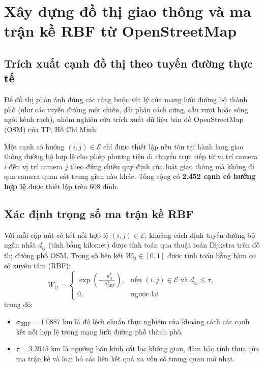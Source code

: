\section{Xây dựng đồ thị giao thông và ma trận kề RBF từ OpenStreetMap}
\label{sec:xay_dung_do_thi_osm}

\subsection{Trích xuất cạnh đồ thị theo tuyến đường thực tế}
Để đồ thị phản ánh đúng các ràng buộc vật lý của mạng lưới đường bộ thành phố (như các tuyến đường một chiều, dải phân cách cứng, cầu vượt hoặc sông ngòi kênh rạch), nhóm nghiên cứu trích xuất dữ liệu bản đồ OpenStreetMap (OSM) của TP. Hồ Chí Minh.

Một cạnh có hướng $(i, j) \in \mathcal{E}$ chỉ được thiết lập nếu tồn tại hành lang giao thông đường bộ hợp lệ cho phép phương tiện di chuyển trực tiếp từ vị trí camera $i$ đến vị trí camera $j$ theo đúng chiều quy định của luật giao thông mà không đi qua camera quan sát trung gian nào khác. Tổng cộng có \textbf{2.452 cạnh có hướng hợp lệ} được thiết lập trên 608 đỉnh.

\subsection{Xác định trọng số ma trận kề RBF}
Với mỗi cặp nút có kết nối hợp lệ $(i, j) \in \mathcal{E}$, khoảng cách định tuyến đường bộ ngắn nhất $d_{ij}$ (tính bằng kilomet) được tính toán qua thuật toán Dijkstra trên đồ thị đường phố OSM. Trọng số liên kết $W_{ij} \in [0, 1]$ được tính toán bằng hàm cơ sở xuyên tâm (RBF):
\begin{equation}
W_{ij} =
\begin{cases}
\exp\left(-\frac{d_{ij}^2}{\sigma_{\mathrm{RBF}}^2}\right), & \text{nếu } (i,j) \in \mathcal{E} \text{ và } d_{ij} \le \tau, \\
0, & \text{ngược lại}
\end{cases}
\end{equation}
trong đó:
\begin{itemize}
    \item $\sigma_{\mathrm{RBF}} = 1.0887\text{ km}$ là độ lệch chuẩn thực nghiệm của khoảng cách các cạnh kết nối hợp lệ trong mạng lưới đường phố thành phố.
    \item $\tau = 3.3945\text{ km}$ là ngưỡng bán kính cắt lọc không gian, đảm bảo tính thưa của ma trận kề và loại bỏ các liên kết quá xa vốn có tương quan mờ nhạt.
\end{itemize}

